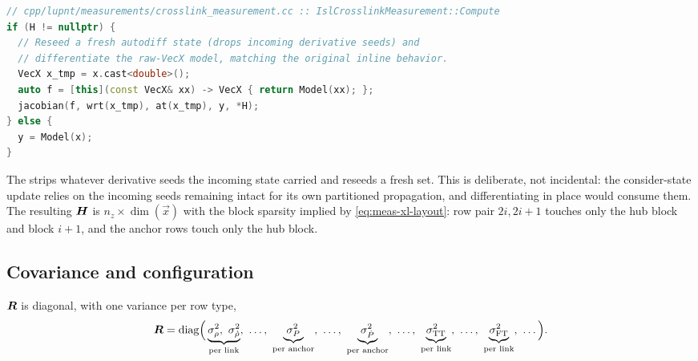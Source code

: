 \begin{lstlisting}[language=cpp, caption={Autodiff on a freshly reseeded raw
  state.}, label={lst:meas-xl-jac}]
// cpp/lupnt/measurements/crosslink_measurement.cc :: IslCrosslinkMeasurement::Compute
if (H != nullptr) {
  // Reseed a fresh autodiff state (drops incoming derivative seeds) and
  // differentiate the raw-VecX model, matching the original inline behavior.
  VecX x_tmp = x.cast<double>();
  auto f = [this](const VecX& xx) -> VecX { return Model(xx); };
  jacobian(f, wrt(x_tmp), at(x_tmp), y, *H);
} else {
  y = Model(x);
}
\end{lstlisting}

The  strips whatever derivative seeds the incoming state
carried and reseeds a fresh set. This is deliberate, not incidental: the
 consider-state update relies on the incoming seeds remaining
intact for its own partitioned propagation, and differentiating in place would
consume them. The resulting $\bm{H}$ is
$n_z \times \dim(\vec{x})$ with the block sparsity implied by
\cref{eq:meas-xl-layout}: row pair $2i, 2i+1$ touches only the hub block and
block $i{+}1$, and the anchor rows touch only the hub block.

\subsection{Covariance and configuration}

$\bm{R}$ is diagonal, with one variance per row type,
\begin{equation}
  \mat{R} = \diag\!\Big(
    \underbrace{\sigma_\rho^2,\ \sigma_{\dot\rho}^2}_{\text{per link}},\ \dots,\
    \underbrace{\sigma_P^2}_{\text{per anchor}},\ \dots,\
    \underbrace{\sigma_{\dot P}^2}_{\text{per anchor}},\ \dots,\
    \underbrace{\sigma_{\mathrm{TT}}^2}_{\text{per link}},\ \dots,\
    \underbrace{\sigma_{\mathrm{FT}}^2}_{\text{per link}},\ \dots
  \Big).
  \label{eq:meas-xl-R}
\end{equation}

